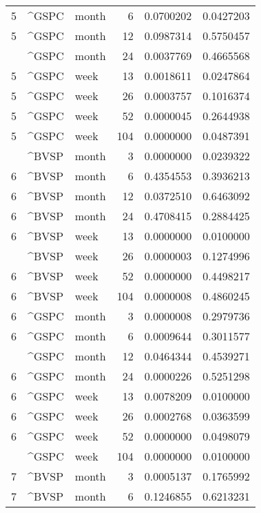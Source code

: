 \begin{tabular}{rllrrr}
5 & \textasciicircum{}GSPC & month & 6 & 0.0700202 & 0.0427203\\
5 & \textasciicircum{}GSPC & month & 12 & 0.0987314 & 0.5750457\\
\addlinespace
5 & \textasciicircum{}GSPC & month & 24 & 0.0037769 & 0.4665568\\
5 & \textasciicircum{}GSPC & week & 13 & 0.0018611 & 0.0247864\\
5 & \textasciicircum{}GSPC & week & 26 & 0.0003757 & 0.1016374\\
5 & \textasciicircum{}GSPC & week & 52 & 0.0000045 & 0.2644938\\
5 & \textasciicircum{}GSPC & week & 104 & 0.0000000 & 0.0487391\\
\addlinespace
6 & \textasciicircum{}BVSP & month & 3 & 0.0000000 & 0.0239322\\
6 & \textasciicircum{}BVSP & month & 6 & 0.4354553 & 0.3936213\\
6 & \textasciicircum{}BVSP & month & 12 & 0.0372510 & 0.6463092\\
6 & \textasciicircum{}BVSP & month & 24 & 0.4708415 & 0.2884425\\
6 & \textasciicircum{}BVSP & week & 13 & 0.0000000 & 0.0100000\\
\addlinespace
6 & \textasciicircum{}BVSP & week & 26 & 0.0000003 & 0.1274996\\
6 & \textasciicircum{}BVSP & week & 52 & 0.0000000 & 0.4498217\\
6 & \textasciicircum{}BVSP & week & 104 & 0.0000008 & 0.4860245\\
6 & \textasciicircum{}GSPC & month & 3 & 0.0000008 & 0.2979736\\
6 & \textasciicircum{}GSPC & month & 6 & 0.0009644 & 0.3011577\\
\addlinespace
6 & \textasciicircum{}GSPC & month & 12 & 0.0464344 & 0.4539271\\
6 & \textasciicircum{}GSPC & month & 24 & 0.0000226 & 0.5251298\\
6 & \textasciicircum{}GSPC & week & 13 & 0.0078209 & 0.0100000\\
6 & \textasciicircum{}GSPC & week & 26 & 0.0002768 & 0.0363599\\
6 & \textasciicircum{}GSPC & week & 52 & 0.0000000 & 0.0498079\\
\addlinespace
6 & \textasciicircum{}GSPC & week & 104 & 0.0000000 & 0.0100000\\
7 & \textasciicircum{}BVSP & month & 3 & 0.0005137 & 0.1765992\\
7 & \textasciicircum{}BVSP & month & 6 & 0.1246855 & 0.6213231\\

\end{tabular}

